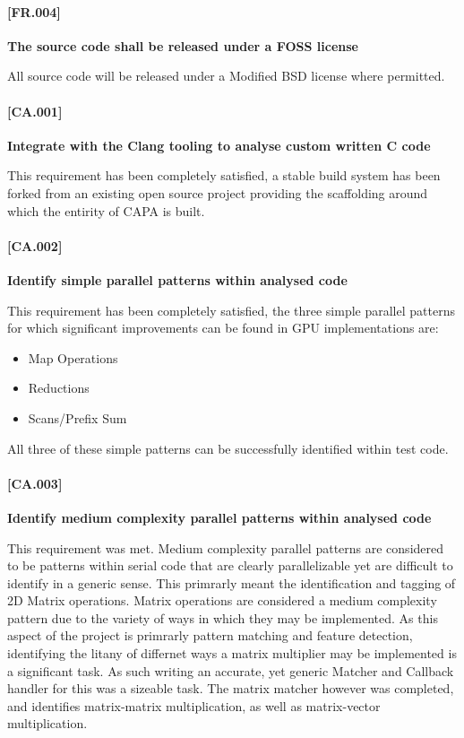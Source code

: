 \paragraph{[FR.004]}
\textbf{The source code shall be released under a FOSS license}

All source code will be released under a Modified BSD license where permitted.


\paragraph{[CA.001]}
\textbf{Integrate with the Clang tooling to analyse custom written C code}

This requirement has been completely satisfied, a stable build system has been forked from an
existing open source project providing the scaffolding around which the entirity of CAPA is built.

\paragraph{[CA.002]}
\textbf{Identify simple parallel patterns within analysed code}

This requirement has been completely satisfied, the three simple parallel patterns for which
significant improvements can be found in GPU implementations are:

\begin{itemize}
\item Map Operations
\item Reductions
\item Scans/Prefix Sum
\end{itemize}

All three of these simple patterns can be successfully identified within test code.

\paragraph{[CA.003]}
\textbf{Identify medium complexity parallel patterns within analysed code}

This requirement was met. Medium complexity parallel patterns are considered to be patterns within serial code that are
clearly parallelizable yet are difficult to identify in a generic sense. This primrarly meant the
identification and tagging of 2D Matrix operations. Matrix operations are considered a medium
complexity pattern due to the variety of ways in which they may be implemented. As this aspect of
the project is primrarly pattern matching and feature detection, identifying the litany of differnet
ways a matrix multiplier may be implemented is a significant task. As such writing an accurate, yet
generic Matcher and Callback handler for this was a sizeable task. The matrix matcher however was
completed, and identifies matrix-matrix multiplication, as well as matrix-vector multiplication. 

